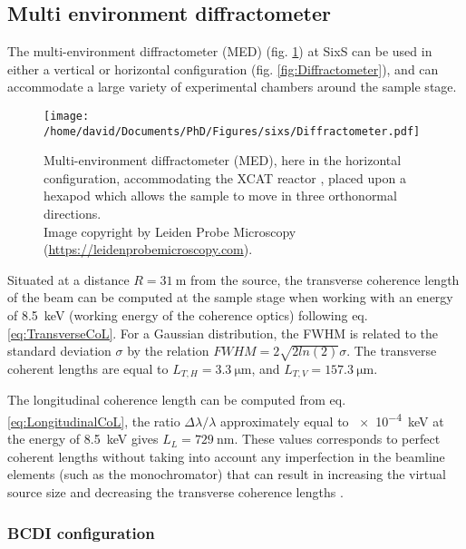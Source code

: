 \subsection{Multi environment diffractometer}\label{sec:MED}

The multi-environment diffractometer (MED) (fig. \ref{fig:MEDDiffractometer}) at SixS can be used in either a vertical or horizontal configuration (fig. \ref{fig:Diffractometer}), and can accommodate a large variety of experimental chambers around the sample stage.

\begin{figure}[!htb]
    \centering
    \texttt{[image: /home/david/Documents/PhD/Figures/sixs/Diffractometer.pdf]}
    \caption{
        Multi-environment diffractometer (MED), here in the horizontal configuration, accommodating the XCAT reactor \parencite{VanRijn2010}, placed upon a hexapod which allows the sample to move in three orthonormal directions.\\
        Image copyright by Leiden Probe Microscopy (\url{https://leidenprobemicroscopy.com}).
    }
    \label{fig:MEDDiffractometer}
\end{figure}

Situated at a distance $R = \qty{31}{\m}$ from the source, the transverse coherence length of the beam can be computed at the sample stage when working with an energy of \qty{8.5}{\keV} (working energy of the coherence optics) following eq. \ref{eq:TransverseCoL}.
For a Gaussian distribution, the FWHM is related to the standard deviation $\sigma$ by the relation $FWHM = 2\sqrt{2 ln (2) } \sigma$.
The transverse coherent lengths are equal to $L_{T,H} = \qty{3.3}{\um}$, and $L_{T,V} = \qty{157.3}{\um}$.

The longitudinal coherence length can be computed from eq. \ref{eq:LongitudinalCoL}, the ratio $\Delta\lambda/\lambda$ approximately equal to \qty{e-4}{\keV} at the energy of \qty{8.5}{\keV} gives $L_L = \qty{729}{\nm}$.
These values corresponds to perfect coherent lengths without taking into account any imperfection in the beamline elements (such as the monochromator) that can result in increasing the virtual source size and decreasing the transverse coherence lengths \parencite{Jacques2010}.

\subsubsection{BCDI configuration}

